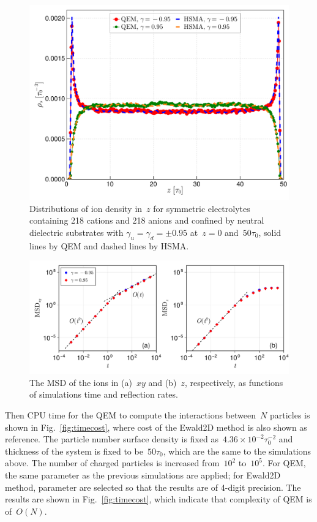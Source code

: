 \begin{figure}[htbp]
    \centering
    \includegraphics[width = 0.8 \linewidth]{figs/compare_HSMA.pdf}
    \caption{
        Distributions of ion density in~$z$ for symmetric electrolytes containing 218 cations and 218 anions and confined by neutral dielectric substrates with $\gamma_u = \gamma_d = \pm 0.95$ at~$z = 0$ and~$50\tau_0$, solid lines by QEM and dashed lines by HSMA.
    }
    \label{fig:MD}
\end{figure}

\begin{figure}[htbp]
    \centering
    \includegraphics[width = 1.0 \linewidth]{figs/msd.pdf}
    \caption{
        The MSD of the ions in (a)~$xy$ and (b)~$z$, respectively, as functions of simulations time and reflection rates.
    }
    \label{fig:msd}
\end{figure}

Then CPU time for the QEM to compute the interactions between~$N$ particles is shown in Fig.~\ref{fig:timecost}, where cost of the Ewald2D method is also shown as reference.
The particle number surface density is fixed as~$4.36 \times 10^{-2} \tau_0^{-2}$ and thickness of the system is fixed to be~$50 \tau_0$, which are the same to the simulations above.
The number of charged particles is increased from~$10^2$ to~$10^5$.
For QEM, the same parameter as the previous simulations are applied; for Ewald2D method, parameter are selected so that the results are of 4-digit precision.
The results are shown in Fig.~\ref{fig:timecost}, which indicate that complexity of QEM is of~$O(N)$.

